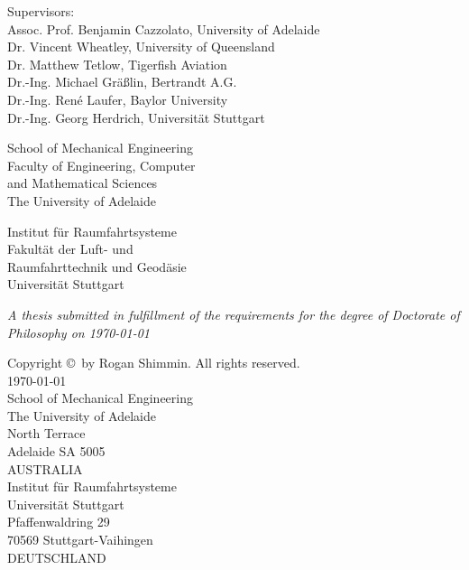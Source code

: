 \begin{titlepage}
\begin{center}
  \small{Supervisors:\\
  Assoc. Prof. Benjamin Cazzolato, University of Adelaide\\
  Dr. Vincent Wheatley, University of Queensland\\
  Dr. Matthew Tetlow, Tigerfish Aviation\\
  Dr.-Ing. Michael Gr\"{a}\ss lin, Bertrandt A.G.\\
  Dr.-Ing. Ren\'{e} Laufer, Baylor University}\\
  Dr.-Ing. Georg Herdrich, Universit\"{a}t Stuttgart
  \end{center}

  \vfill

  \small{
  \begin{minipage}{0.5\textwidth}%
  School of Mechanical Engineering\\
  Faculty of Engineering, Computer\\ and Mathematical Sciences\\
  The University of Adelaide
  \end{minipage}
  \begin{minipage}{0.5\textwidth}%
  Institut f\"{u}r Raumfahrtsysteme\\
  Fakult\"{a}t der Luft- und\\ Raumfahrttechnik und Geod\"{a}sie\\
  Universit\"{a}t Stuttgart
  \end{minipage}}

  \vfill

  \center
  \emph{A thesis submitted in fulfillment of the requirements for the degree of Doctorate of Philosophy on \mydate\today}

\end{titlepage}

\newpage\thispagestyle{empty}
{\setlength\parindent{0pt}

Copyright \copyright\the\year\ by Rogan Shimmin. All rights reserved.\\[2cm]

\today\\[2cm]

School of Mechanical Engineering\\
The University of Adelaide\\
North Terrace \\
Adelaide SA 5005\\
AUSTRALIA\\[2cm]

Institut f\"{u}r Raumfahrtsysteme\\
Universit\"{a}t Stuttgart\\
Pfaffenwaldring 29\\
70569 Stuttgart-Vaihingen\\
DEUTSCHLAND
}

